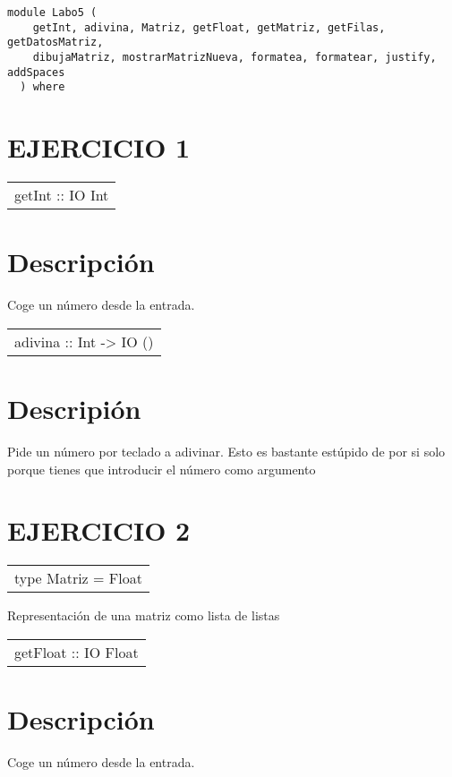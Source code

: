 \label{module:Labo5}
\haddockbeginheader
{\haddockverb\begin{verbatim}
module Labo5 (
    getInt, adivina, Matriz, getFloat, getMatriz, getFilas, getDatosMatriz,
    dibujaMatriz, mostrarMatrizNueva, formatea, formatear, justify, addSpaces
  ) where\end{verbatim}}
\haddockendheader

\section{EJERCICIO 1}
\begin{haddockdesc}
\item[\begin{tabular}{@{}l}
getInt :: IO Int
\end{tabular}]
{\haddockbegindoc
\section*{Descripción}
Coge un número desde la entrada.\par}
\end{haddockdesc}
\begin{haddockdesc}
\item[\begin{tabular}{@{}l}
adivina :: Int -> IO ()
\end{tabular}]
{\haddockbegindoc
\section*{Descripión}
Pide un número por teclado a adivinar. Esto es bastante estúpido de por si solo porque tienes que introducir el número como argumento\par}
\end{haddockdesc}
\section{EJERCICIO 2}
\begin{haddockdesc}
\item[\begin{tabular}{@{}l}
type Matriz = {\char 91}{\char 91}Float{\char 93}{\char 93}
\end{tabular}]
{\haddockbegindoc
Representación de una matriz como lista de listas\par}
\end{haddockdesc}
\begin{haddockdesc}
\item[\begin{tabular}{@{}l}
getFloat :: IO Float
\end{tabular}]
{\haddockbegindoc
\section*{Descripción}
Coge un número desde la entrada.\par}
\end{haddockdesc}
